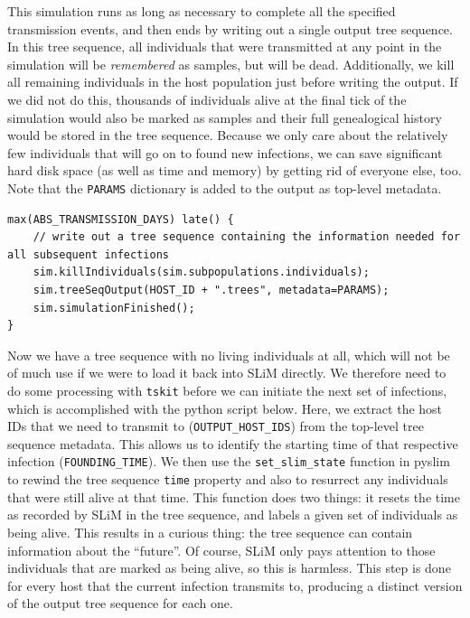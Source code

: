 \documentclass[12pt]{article}
\newcommand{\tskit}[0]{\texttt{tskit}\xspace}
\begin{document}
This simulation runs as long as necessary to complete all the specified transmission events, and then ends by writing out a single output tree sequence. In this tree sequence, all
individuals that were transmitted at any point in the simulation will be \textit{remembered} as samples, but will be dead. Additionally, we kill all remaining individuals in the host population
just before writing the output. If we did not do this, thousands of individuals alive at the final tick of the simulation would also be marked as samples and their full genealogical history
would be stored in the tree sequence. Because we only care about the relatively few individuals that will go on to found new infections, we can save significant hard disk space
(as well as time and memory) by getting rid of everyone else, too. Note that the \verb|PARAMS| dictionary is added to the output as top-level metadata.

\begin{lstlisting}[language=slim, style=slimstyle, breaklines=true]
max(ABS_TRANSMISSION_DAYS) late() {
	// write out a tree sequence containing the information needed for all subsequent infections
	sim.killIndividuals(sim.subpopulations.individuals);
	sim.treeSeqOutput(HOST_ID + ".trees", metadata=PARAMS);
	sim.simulationFinished();
}
\end{lstlisting}

Now we have a tree sequence with no living individuals at all, which will not be of much use if we were to load it back into SLiM directly. We therefore need to do some processing
with \tskit before we can initiate the next set of infections, which is accomplished with the python script below. Here, we extract the host IDs that we need to transmit to (\verb|OUTPUT_HOST_IDS|)
from the top-level tree sequence metadata. This allows us to identify the starting time of that respective infection (\verb|FOUNDING_TIME|).
We then use the \verb|set_slim_state| function in pyslim to rewind
the tree sequence \verb|time| property and also to resurrect any individuals that were still alive at that time.
This function does two things: it resets the time as recorded by SLiM in the tree sequence,
and labels a given set of individuals as being alive.
This results in a curious thing: the tree sequence can contain information about the ``future''.
Of course, SLiM only pays attention to those individuals that are marked as being alive,
so this is harmless.
This step is done for every host that the current infection transmits to, producing
a distinct version of the output tree sequence for each one.
\end{document}
